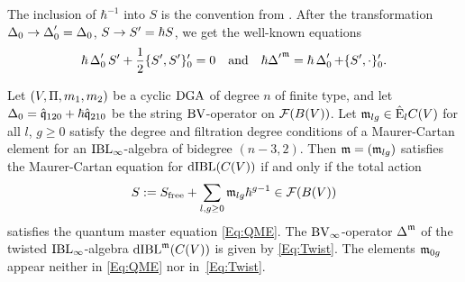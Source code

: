 \documentclass[\MainFolder/Text.tex]{subfiles}
\begin{document}
The inclusion of $\hbar^{-1}$ into $S$ is the convention from \cite{Cieliebak2015}.
After the transformation $\operatorname{\Delta}_0 \to \operatorname{\Delta}_0' = \operatorname{\Delta}_0$, $S\to S' = \hbar S$, we get the well-known equations
\begin{equation*}
 \hbar \operatorname{\Delta}_0' S' + \frac{1}{2} \{S',S'\}_0' = 0\quad\text{and}\quad \hbar {\operatorname{\Delta}'}^{\mathfrak{m}}= \hbar \operatorname{\Delta}_0' + \{S',\cdot\}_0'.
\end{equation*} 



\begin{Proposition}\label{Prop:BVActForAnyMCElement}
Let $(V,\Pi,m_1,m_2)$ be a cyclic $\mathrm{DGA}$ of degree $n$ of finite type, and let $\operatorname{\Delta}_0 = \hat{\mathfrak{q}}_{120} + \hbar \hat{\mathfrak{q}}_{210}$ be the string $\mathrm{BV}$-operator on $\mathcal{F}(B(V))$.
Let $\mathfrak{m}_{lg}\in \hat{\mathrm{E}}_l C(V)$ for all $l$, $g\ge 0$ satisfy the degree and filtration degree conditions of a Maurer-Cartan element for an $\mathrm{IBL}_\infty$-algebra of bidegree $(n-3,2)$.%
Then $\mathfrak{m} = (\mathfrak{m}_{lg})$ satisfies the Maurer-Cartan equation for $\mathrm{dIBL}(C(V))$ if and only if the total action
\begin{equation}\label{Eq:MyAction}
 S := S_{\mathrm{free}} + \sum_{l,g\ge 0} \mathfrak{m}_{lg} \hbar^{g-1}  \in \mathcal{F}(B(V))
\end{equation}
satisfies the quantum master equation \eqref{Eq:QME}.
The $\mathrm{BV}_\infty$-operator $\operatorname{\Delta}^{\mathfrak{m}}$ of the twisted $\mathrm{IBL}_\infty$-algebra $\mathrm{dIBL}^{\mathfrak{m}}(C(V))$ is given by \eqref{Eq:Twist}.
The elements $\mathfrak{m}_{0g}$ appear neither in \eqref{Eq:QME} nor in~\eqref{Eq:Twist}.
\end{Proposition}
\end{document}
